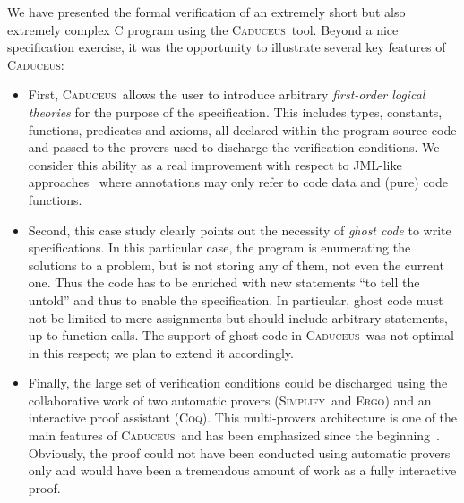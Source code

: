 \documentclass[a4paper]{llncs}
\newcommand{\caduceus}{\textsc{Caduceus}}
\newcommand{\simplify}{\textsc{Simplify}}
\newcommand{\ergo}{\textsc{Ergo}}
\newcommand{\coq}{\textsc{Coq}}
\begin{document}
We have presented the formal verification of an extremely short but
also extremely complex C program using the \caduceus\ tool. Beyond a
nice specification exercise, it was the opportunity to illustrate
several key features of \caduceus:
\begin{itemize}
\item 
  First, \caduceus\ allows the user to introduce arbitrary
  \emph{first-order logical theories} for the purpose of the
  specification. This includes types, constants, functions, predicates
  and axioms, all declared within the program source code and passed
  to the provers used to discharge the verification conditions.
  We consider this ability as a real improvement with respect to
  JML-like approaches~\cite{JML} where annotations may only refer to code data
  and (pure) code functions. 

\item 
  Second, this case study clearly points out the necessity of
  \emph{ghost code} to write specifications. In this particular case,
  the program is enumerating the solutions to a problem, but is not
  storing any of them, not even the current one. Thus the code has to
  be enriched with new statements ``to tell the untold'' and thus to
  enable the specification. In particular, ghost code must not be
  limited to mere assignments but should include arbitrary statements,
  up to function calls. The support of ghost code in \caduceus\ was
  not optimal in this respect; we plan to extend it accordingly.

\item 
  Finally, the large set of verification conditions could be
  discharged using the collaborative work of two automatic provers
  (\simplify\ and \ergo) and an interactive proof assistant
  (\coq). This multi-provers architecture is one of the main features
  of \caduceus\ and has been emphasized since the
  beginning~\cite{FilliatreMarche04}. Obviously, the proof could not
  have been conducted using automatic provers only and would have been
  a tremendous amount of work as a fully interactive proof.
\end{itemize}
\end{document}
